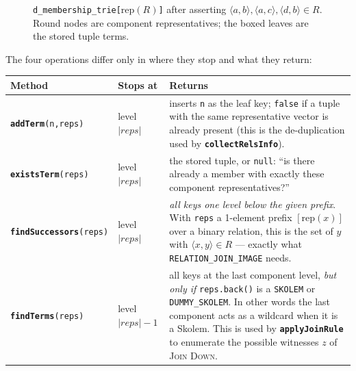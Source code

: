 \documentclass[11pt,a4paper]{article}
\newcommand{\code}[1]{\texttt{\small #1}}
\newcommand{\fn}[1]{\texttt{\small\bfseries #1}}
\newcommand{\tup}[1]{\langle #1 \rangle}
\newcommand{\rep}[1]{\mathrm{rep}(#1)}
\theoremstyle{definition}
\begin{document}
\begin{figure}[h]\centering
{}
\caption{\code{d\_membership\_trie[$\rep{R}$]} after asserting
$\tup{a,b},\tup{a,c},\tup{d,b}\in R$. Round nodes are component
representatives; the boxed leaves are the stored tuple terms.}
\label{fig:trie}
\end{figure}

\noindent
The four operations differ only in where they stop and what they return:

\begin{center}\small
\begin{tabular}{@{}llp{7.6cm}@{}}
\toprule
Method & Stops at & Returns\\
\midrule
\fn{addTerm}\code{(n,reps)} & level $|reps|$ & inserts \code{n} as the leaf key;
  \code{false} if a tuple with the same representative vector is already
  present (this is the de-duplication used by \fn{collectRelsInfo}).\\
\fn{existsTerm}\code{(reps)} & level $|reps|$ & the stored tuple, or
  \code{null}: ``is there already a member with exactly these component
  representatives?''\\
\fn{findSuccessors}\code{(reps)} & level $|reps|$ & \emph{all keys one level
  below the given prefix}. With \code{reps} a 1-element prefix $[\rep{x}]$ over
  a binary relation, this is the set of $y$ with $\tup{x,y}\in R$ --- exactly
  what \code{RELATION\_JOIN\_IMAGE} needs.\\
\fn{findTerms}\code{(reps)} & level $|reps|-1$ & all keys at the last component
  level, \emph{but only if} \code{reps.back()} is a \code{SKOLEM} or
  \code{DUMMY\_SKOLEM}. In other words the last component acts as a wildcard
  when it is a Skolem. This is used by \fn{applyJoinRule} to enumerate the
  possible witnesses $z$ of \textsc{Join Down}.\\
\bottomrule
\end{tabular}
\end{center}
\end{document}
